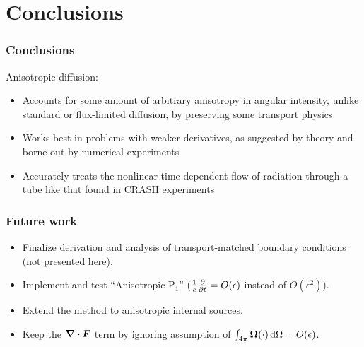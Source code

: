 \documentclass{beamer}
\begin{document}
\section{Conclusions}
\begin{frame}
  \frametitle{Conclusions}
  Anisotropic diffusion:
  \begin{itemize}
    \item Accounts for some amount of arbitrary anisotropy in
      angular intensity, unlike standard or flux-limited diffusion, by
      preserving some transport physics
    \item Works best in problems with weaker derivatives, as suggested by
      theory and borne out by numerical experiments
    \item Accurately treats the nonlinear time-dependent flow of radiation
      through a tube like that found in CRASH experiments
  \end{itemize}
\end{frame}
\begin{frame}
  \frametitle{Future work}
  \begin{itemize}
    \item Finalize derivation and analysis of transport-matched boundary conditions (not
      presented here).
    \item Implement and test ``Anisotropic P$_1$''
      ($\frac1c\frac{\partial }{\partial t}=O(\epsilon)$ instead of $O(\epsilon^2)$).
    \item Extend the method to anisotropic internal sources.
    \item Keep the $\bm{\nabla} \bm{\cdot} \bm{F}$ term by ignoring assumption of
      $\int_{4\pi} \bm{\Omega} (\cdot) \mathop{}\!\mathrm{d} \Omega = O(\epsilon)$.
  \end{itemize}
\end{frame}
\appendix
\end{document}
